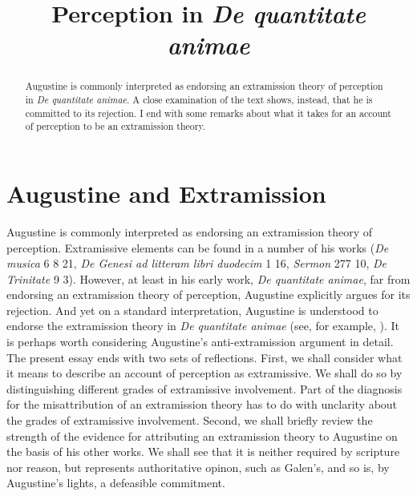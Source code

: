 \documentclass[12pt]{article}
\title{Perception in \emph{De quantitate animae}}
\author{\myauthor}
\date{} %
\begin{document}
\maketitle
\begin{abstract}
	\noindent Augustine is commonly interpreted as endorsing an extramission theory of perception in \emph{De quantitate animae}. A close examination of the text shows, instead, that he is committed to its rejection. I end with some remarks about what it takes for an account of perception to be an extramission theory.
\end{abstract}

\setlength{\parindent}{1em}


\section{Augustine and Extramission} %
\label{sec:augustine_and_extramission}

Augustine is commonly interpreted as endorsing an extramission theory of perception. Extramissive elements can be found in a number of his works (\emph{De musica} 6 8 21, \emph{De Genesi ad litteram libri duodecim} 1 16, \emph{Sermon} 277 10, \emph{De Trinitate} 9 3). However, at least in his early work, \emph{De quantitate animae}, far from endorsing an extramission theory of perception, Augustine explicitly argues for its rejection. And yet on a standard interpretation, Augustine is understood to endorse the extramission theory in \emph{De quantitate animae} (see, for example, \citealt[82--3]{ODaly:1987fq}). It is perhaps worth considering Augustine's anti-extramission argument in detail. The present essay ends with two sets of reflections. First, we shall consider what it means to describe an account of perception as extramissive. We shall do so by distinguishing different grades of extramissive involvement. Part of the diagnosis for the misattribution of an extramission theory has to do with unclarity about the grades of extramissive involvement. Second, we shall briefly review the strength of the evidence for attributing an extramission theory to Augustine on the basis of his other works. We shall see that it is neither required by scripture nor reason, but represents authoritative opinon, such as Galen's, and so is, by Augustine's lights, a defeasible commitment.

\end{document}
